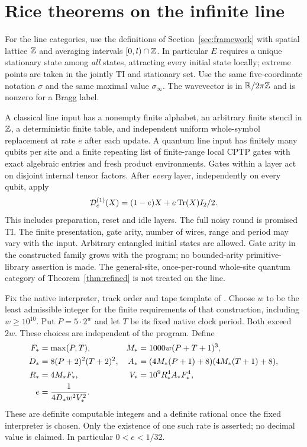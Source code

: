 \section{Rice theorems on the infinite line}\label{sec:line-results}
For the line categories, use the definitions of Section~\ref{sec:framework}
with spatial lattice $\mathbb Z$ and averaging intervals $[0,l)\cap\mathbb Z$.
In particular $E$ requires a unique stationary state among \emph{all}
states, attracting every initial state locally; extreme points are taken
in the jointly TI and stationary set. Use the same five-coordinate
notation $\sigma$ and the same maximal value $\sigma_\infty$.
The wavevector is in $\mathbb R/2\pi\mathbb Z$ and is nonzero for a Bragg label.

A classical line input has a nonempty finite alphabet, an arbitrary
finite stencil in $\mathbb Z$, a deterministic finite table, and independent
uniform whole-symbol replacement at rate $e$ after each update.
A quantum line input has finitely many qubits per site and a finite
repeating list of finite-range local CPTP gates with exact algebraic
entries and fresh product environments. Gates within a layer act on
disjoint internal tensor factors. After \emph{every} layer, independently
on every qubit, apply
\[
 \mathcal D^{(1)}_e(X)=(1-e)X+e\operatorname{Tr}(X)I_2/2.
\]
This includes preparation, reset and idle layers. The full noisy round
is promised TI. The finite presentation, gate arity, number of wires,
range and period may vary with the input. Arbitrary entangled initial
states are allowed. Gate arity in the constructed family grows with
the program; no bounded-arity primitive-library assertion is made.
The general-site, once-per-round whole-site quantum category of
Theorem~\ref{thm:refined} is not treated on the line.

Fix the native interpreter, track order and tape template of
\cite[Section~3 and Appendix~A]{DMline}. Choose $w$ to be the least
admissible integer for the finite requirements of that construction,
including $w\ge10^{10}$. Put $P=5\cdot2^w$ and let $T$ be its fixed
native clock period. Both exceed $2w$. These choices are independent
of the program. Define
\begin{align}
 F_*&=\max(P,T),& M_*&=1000w(P+T+1)^3,\notag\\
 D_*&=8(P+2)^2(T+2)^2,&
 A_*&=(4M_*(P+1)+8)(4M_*(T+1)+8),\notag\\
 R_*&=4M_*F_*,& V_*&=10^9R_*^4A_*F_*^4,\notag\\
 e&=\frac{1}{4D_*w^2V_*^2}.&&\label{eq:line-rate}
\end{align}
These are definite computable integers and a definite rational once the
fixed interpreter is chosen. Only the existence of one such rate is
asserted; no decimal value is claimed. In particular $0<e<1/32$.

